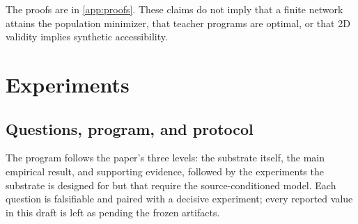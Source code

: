 \documentclass{article}
\theoremstyle{definition}
\theoremstyle{remark}
\begin{document}
The proofs are in \cref{app:proofs}. These claims do not imply that a finite network attains the population minimizer, that teacher programs are optimal, or that 2D validity implies synthetic accessibility.

\section{Experiments}

\subsection{Questions, program, and protocol}
\label{sec:questions}

The program follows the paper's three levels: the substrate itself, the main empirical result, and supporting evidence, followed by the experiments the substrate is designed for but that require the source-conditioned model. Each question is falsifiable and paired with a decisive experiment; every reported value in this draft is left as \XXX{} pending the frozen artifacts.
\end{document}
